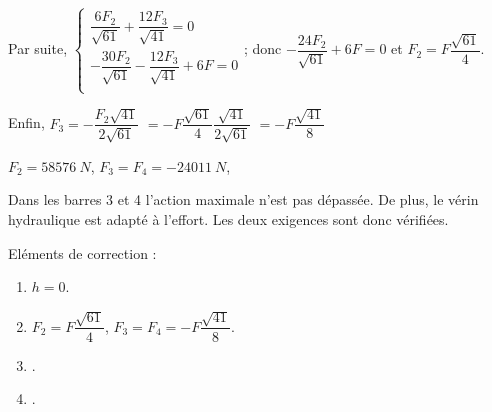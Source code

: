 \begin{corrige}
Par suite, 
$
\left\{
\begin{array}{l}
\dfrac{6F_2}{\sqrt{61}}	+\dfrac{12F_3}{\sqrt{41}} =0 \\
-\dfrac{30F_2}{\sqrt{61}}	-\dfrac{12F_3}{\sqrt{41}} + 6F=0 \\
\end{array}
\right.
$; donc $-\dfrac{24F_2}{\sqrt{61}} + 6F=0 $ et 
${F_2} = F \dfrac{\sqrt{61}}{4}$.

Enfin, 
$F_3 = -\dfrac{F_2\sqrt{41}}{2\sqrt{61}}$ 
$= -F \dfrac{\sqrt{61}}{4} \dfrac{\sqrt{41}}{2\sqrt{61}}$
$= -F  \dfrac{\sqrt{41}}{8}$
\end{corrige}
\else
\fi


\ifprof
\begin{corrige}
$F_2 = \SI{58576}{N}$, $F_3 = F_4 = -\SI{24011}{N}$, 
\end{corrige}
\else
\fi

\ifprof
\begin{corrige}
Dans les barres 3 et 4 l'action maximale n'est pas dépassée. 
De plus, le vérin hydraulique est adapté à l'effort.
Les deux exigences sont donc vérifiées. 

\end{corrige}
\else
\fi

\ifcolle
\else
Eléments de correction :
\begin{enumerate}
\item $h=0$.
\item $F_2 = F \dfrac{\sqrt{61}}{4}$, $F_3 = F_4 = -F  \dfrac{\sqrt{41}}{8}$.
\item .
\item .
\end{enumerate}
\fi